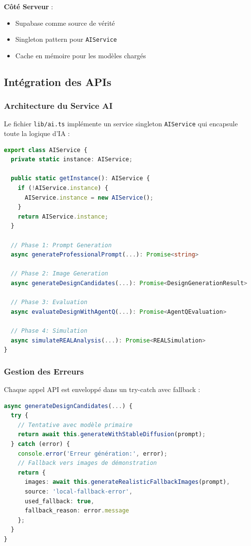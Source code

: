 \textbf{Côté Serveur} :
\begin{itemize}[leftmargin=*]
    \item Supabase comme source de vérité
    \item Singleton pattern pour \texttt{AIService}
    \item Cache en mémoire pour les modèles chargés
\end{itemize}

\subsection{Intégration des APIs}

\subsubsection{Architecture du Service AI}

Le fichier \texttt{lib/ai.ts} implémente un service singleton \texttt{AIService} qui encapsule toute la logique d'IA :

\begin{lstlisting}[language=TypeScript, caption=Structure du service AI]
export class AIService {
  private static instance: AIService;
  
  public static getInstance(): AIService {
    if (!AIService.instance) {
      AIService.instance = new AIService();
    }
    return AIService.instance;
  }
  
  // Phase 1: Prompt Generation
  async generateProfessionalPrompt(...): Promise<string>
  
  // Phase 2: Image Generation
  async generateDesignCandidates(...): Promise<DesignGenerationResult>
  
  // Phase 3: Evaluation
  async evaluateDesignWithAgentQ(...): Promise<AgentQEvaluation>
  
  // Phase 4: Simulation
  async simulateREALAnalysis(...): Promise<REALSimulation>
}
\end{lstlisting}

\subsubsection{Gestion des Erreurs}

Chaque appel API est enveloppé dans un try-catch avec fallback :

\begin{lstlisting}[language=TypeScript, caption=Pattern de gestion d'erreurs]
async generateDesignCandidates(...) {
  try {
    // Tentative avec modèle primaire
    return await this.generateWithStableDiffusion(prompt);
  } catch (error) {
    console.error('Erreur génération:', error);
    // Fallback vers images de démonstration
    return {
      images: await this.generateRealisticFallbackImages(prompt),
      source: 'local-fallback-error',
      used_fallback: true,
      fallback_reason: error.message
    };
  }
}
\end{lstlisting}

